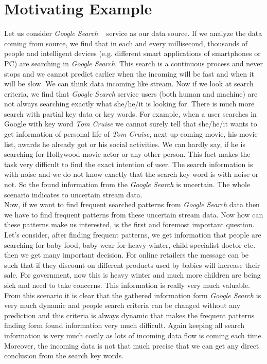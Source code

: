 \section{Motivating Example}
Let us consider \emph{Google Search} ~\cite{google} service as our data source. If we analyze the data coming from source, we find that in each and every millisecond, thousands of people and intelligent devices (e.g. different smart applications of smartphones or PC) are searching in \emph{Google Search}. This search is a continuous process and never stops and we cannot predict earlier when the incoming will be fast and when it will be slow. We can think data incoming like stream. Now if we look at search criteria, we find that \emph{Google Search} service users (both human and machine) are not always searching exactly what she/he/it is looking for. There is much more search with partial key data or key words. For example, when a user searches in Google with key word \emph{Tom Cruise} we cannot surely tell that she/he/it wants to get information of personal life of \emph{Tom Cruise}, next up-coming movie, his movie list, awards he already got or his social activities. We can hardly say, if he is searching for Hollywood movie actor or any other person. This fact makes the task very difficult to find the exact intention of user. The search information is with noise and we do not know exactly that the search key word is with noise or not. So the found information from the \emph{Google Search} is uncertain. The whole scenario indicates to uncertain stream data. \\
Now, if we want to find frequent searched patterns from \emph{Google Search} data then we have to find frequent patterns from these uncertain stream data. Now how can these patterns make us interested, is the first and foremost important question. Let’s consider, after finding frequent patterns, we get information that people are searching for baby food, baby wear for heavy winter, child specialist doctor etc. then we get many important decision. For online retailers the message can be such that if they discount on different products used by babies will increase their sale. For government, now this is heavy winter and much more children are being sick and need to take concerns. This information is really very much valuable.\\
From this scenario it is clear that the gathered information form \emph{Google Search} is very much dynamic and people search criteria can be changed without any prediction and this criteria is always dynamic that makes the frequent patterns finding form found information very much difficult. Again keeping all search information is very much costly as lots of incoming data flow is coming each time. Moreover, the incoming data is not that much precise that we can get any direct conclusion from the search key words.

